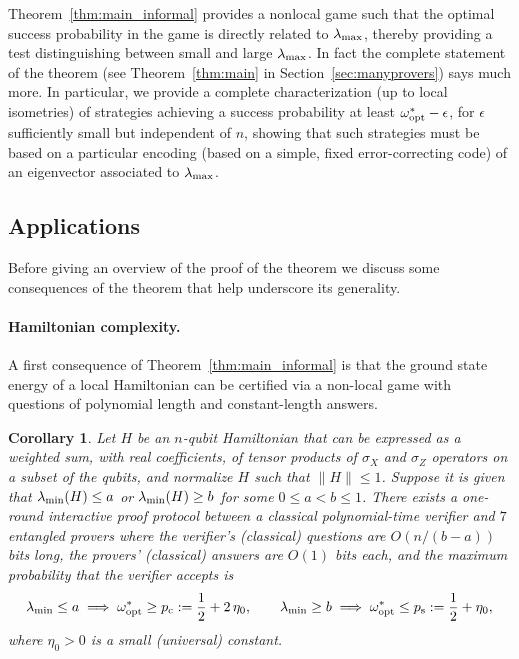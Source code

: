 \documentclass[11pt,letterpaper]{article}
\newcommand{\<}{\langle}
\renewcommand{\>}{\rangle}
\newtheorem{corollary}[theorem]{Corollary}
\newcommand{\eps}{\epsilon}
\begin{document}
Theorem~\ref{thm:main_informal} provides a nonlocal game such that the
optimal success probability in the game is directly related to
$\lambda_{\rm max}$, thereby providing a test distinguishing between
small and large $\lambda_{\rm max}$. In fact the complete statement of
the theorem (see Theorem~\ref{thm:main} in Section~\ref{sec:manyprovers}) says much
more. In particular, we provide a complete characterization (up to
local isometries) of strategies achieving a success probability at
least $\omega^*_{\rm opt} - \eps$, for $\eps$ sufficiently small but independent of $n$, showing that such strategies must be based on a particular
encoding (based on a simple, fixed error-correcting code) of an eigenvector associated to $\lambda_{\rm max}$. 

\subsection{Applications}

Before giving an overview of the proof of the theorem we discuss some consequences of the theorem that help underscore its generality.

\paragraph{Hamiltonian complexity.} 
A first consequence of Theorem~\ref{thm:main_informal} is that the ground state
energy of a local Hamiltonian can be certified via a non-local game
with questions of polynomial length and constant-length
answers.%

\begin{corollary}\label{cor:qma}
  Let $H$ be an $n$-qubit Hamiltonian that can be expressed as a weighted sum, with real coefficients, of tensor
  products of $\sigma_X$ and $\sigma_Z$ operators on a subset of the
  qubits, and normalize $H$ such that $\|H\|\leq 1$. Suppose it is given that $\lambda_{\rm min}(H) \leq a$ or
  $\lambda_{\rm min}(H) \geq b$ for some $0\leq a<b\leq 1$. There exists a one-round interactive
  proof protocol between a classical polynomial-time verifier and
  $7$ entangled provers where the verifier's (classical)
  questions are $O(n /(b-a))$ bits long, the provers' (classical)
  answers are $O(1)$ bits each, and the maximum probability that the
  verifier accepts is
$$\lambda_{\rm min} \leq a \implies \omega^*_{\rm opt} \geq p_{\rm
  c} := \frac{1}{2} +2\,\eta_0 ,\qquad \lambda_{\rm min} \geq
b \implies \omega^*_{\rm opt} \leq p_{\rm s} := \frac{1}{2} + \eta_0,$$
where $\eta_0>0$ is a small (universal) constant. 
\end{corollary}
\end{document}
